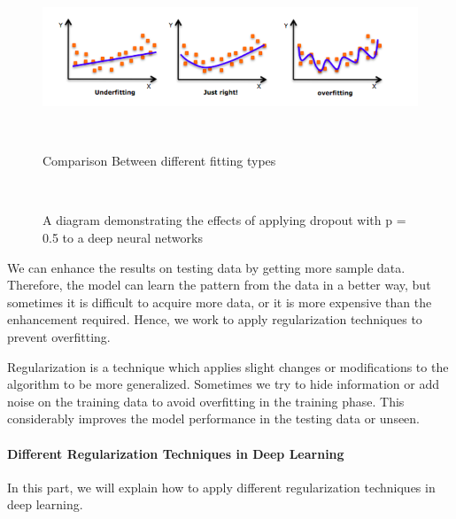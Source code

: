 \begin{figure}[!t]
 \centering
 \includegraphics[scale=0.6]{./Figures/Ch_2_Background/Fig_Fitting.png}
\caption{Comparison Between different fitting types}~\label{Fig:Fitting}
   \end{figure}%

\begin{figure}[!t]
 \centering

\caption{A diagram demonstrating the effects of applying dropout with p = 0.5 to a deep neural networks~\cite{Gitrepo_NN_Tikz}}~\label{Fig:NN_Dropout}
   \end{figure}%

We can enhance the results on testing data by getting more sample data. Therefore, the model can learn the pattern from the data in a better way, but sometimes it is difficult to acquire more data, or it is more expensive than the enhancement required. Hence, we work to apply regularization techniques to prevent overfitting.

Regularization is a technique which applies slight changes or modifications to the algorithm to be more generalized. Sometimes we try to hide information or add noise on the training data to avoid overfitting in the training phase. This considerably improves the model performance in the testing data or unseen.

\paragraph{Different Regularization Techniques in Deep Learning}

In this part, we will explain how to apply different regularization techniques in deep learning.

